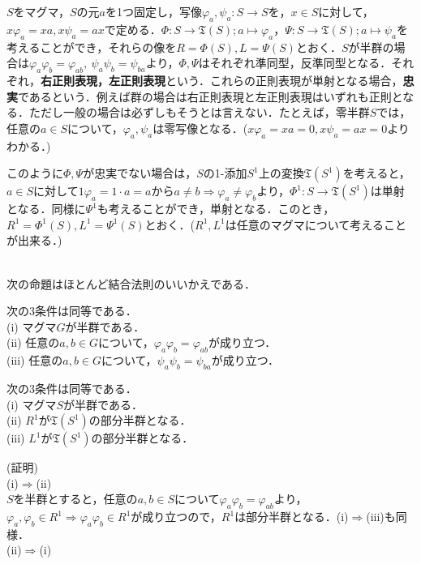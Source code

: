 $S$をマグマ，$S$の元$a$を1つ固定し，写像$\varphi_a, \psi_a:S\rightarrow S$を，$x\in S$に対して，$x\varphi_a=xa,x\psi_a=ax$で定める．$\Phi:S\rightarrow{\mathfrak T}(S);a\mapsto \varphi_a$，$\Psi:S\rightarrow{\mathfrak T}(S);a\mapsto \psi_a$を考えることができ，それらの像を$R=\Phi(S), L=\Psi(S)$とおく．$S$が半群の場合は$\varphi_a\varphi_b=\varphi_{ab},\:\psi_a\psi_b=\psi_{ba}$より，$\Phi,\Psi$はそれぞれ準同型，反準同型となる．それぞれ，{\bf 右正則表現，左正則表現}という．これらの正則表現が単射となる場合，{\bf 忠実}であるという．例えば群の場合は右正則表現と左正則表現はいずれも正則となる．ただし一般の場合は必ずしもそうとは言えない．たとえば，零半群$S$では，任意の$a\in S$について，$\varphi_a,\psi_a$は零写像となる．($x\varphi_a=xa=0, x\psi_a=ax=0$よりわかる．)\par
このように$\Phi,\Psi$が忠実でない場合は，$S$の1-添加$S^1$上の変換${\mathfrak T}(S^1)$を考えると，$a\in S$に対して$1\varphi_a=1\cdot a=a$から$a\neq b\Rightarrow \varphi_a\neq \varphi_b$より，$\Phi^1:S\rightarrow{\mathfrak T}(S^1)$は単射となる．同様に$\Psi^1$も考えることができ，単射となる．このとき，$R^1=\Phi^1(S), L^1=\Psi^1(S)$とおく．($R^1,L^1$は任意のマグマについて考えることが出来る．)\par
\leavevmode \\
次の命題はほとんど結合法則のいいかえである．
\begin{sprop}
次の3条件は同等である．\\
(i) マグマ$G$が半群である．\\
(ii) 任意の$a,b\in G$について，$\varphi_a\varphi_b=\varphi_{ab}$が成り立つ．\\
(iii) 任意の$a,b\in G$について，$\psi_a\psi_b=\psi_{ba}$が成り立つ．
\end{sprop}
\begin{sprop}
次の3条件は同等である．\\
(i) マグマ$S$が半群である．\\
(ii) $R^1$が${\mathfrak T}(S^1)$の部分半群となる． \\
(iii) $L^1$が${\mathfrak T}(S^1)$の部分半群となる．
\end{sprop}
(証明) \\
(i)$\Rightarrow$(ii) \\
$S$を半群とすると，任意の$a,b\in S$について$\varphi_a\varphi_b=\varphi_{ab}$より，$\varphi_a,\varphi_b \in R^1\Rightarrow\varphi_a\varphi_b\in R^1$が成り立つので，$R^1$は部分半群となる．(i)$\Rightarrow$(iii)も同様．\\
(ii)$\Rightarrow$(i)　\\
